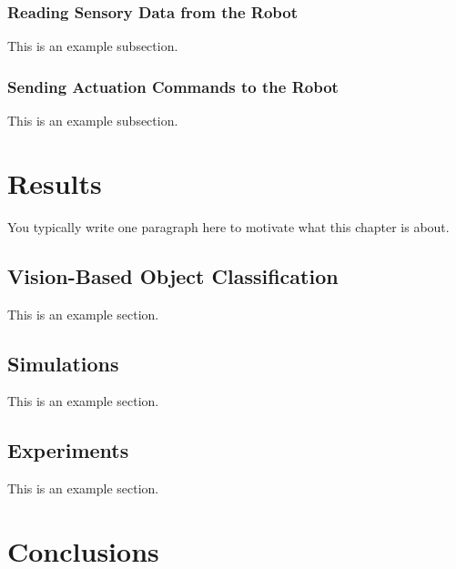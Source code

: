 \documentclass[12pt,letterpaper,oneside,reqno]{book}
\theoremstyle{plain}
\theoremstyle{definition}
\theoremstyle{plain}
\theoremstyle{remark}
\theoremstyle{plain}
\theoremstyle{definition}
\theoremstyle{plain}
\begin{document}
\subsection{Reading Sensory Data from the Robot}
This is an example subsection.

\subsection{Sending Actuation Commands to the Robot}
This is an example subsection.


\chapter{Results}
You typically write one paragraph here to motivate what this chapter is about.

\section{Vision-Based Object Classification}
This is an example section.

\section{Simulations}
This is an example section.

\section{Experiments}
This is an example section.


\chapter{Conclusions}


\end{document}

